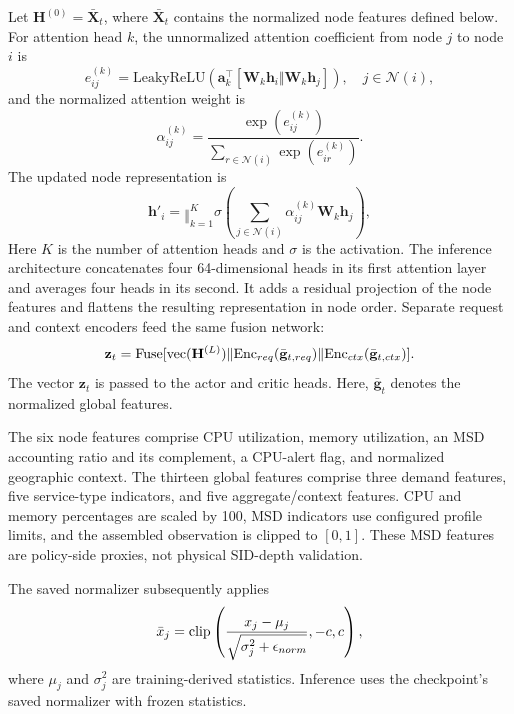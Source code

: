 \documentclass[final,5p]{elsarticle}
\newcommand{\rev}[1]{\textcolor{revisiongreen}{#1}}
\let\newrev\rev
\begin{document}
Let \rev{\(\mathbf{H}^{(0)}=\bar{\mathbf{X}}_t\), where \(\bar{\mathbf X}_t\) contains the normalized node features defined below.} For attention head \(k\), the unnormalized attention coefficient from node \(j\) to node \(i\) is
\begin{equation}
    e_{ij}^{(k)}
    =
    \mathrm{LeakyReLU}
    \left(
    \mathbf{a}_{k}^{\top}
    [\mathbf{W}_{k}\mathbf{h}_i \Vert \mathbf{W}_{k}\mathbf{h}_j]
    \right),
    \quad j\in\mathcal{N}(i),
\end{equation}
and the normalized attention weight is
\begin{equation}
    \alpha_{ij}^{(k)}
    =
    \frac{\exp(e_{ij}^{(k)})}
    {\sum_{r\in\mathcal{N}(i)}\exp(e_{ir}^{(k)})}.
\end{equation}
The updated node representation is
\begin{equation}
    \mathbf{h}'_i
    =
    \mathop{\Vert}_{k=1}^{K}
    \sigma
    \left(
    \sum_{j\in\mathcal{N}(i)}
    \alpha_{ij}^{(k)}\mathbf{W}_{k}\mathbf{h}_j
    \right),
\end{equation}
\newrev{Here \(K\) is the number of attention heads and \(\sigma\) is the activation. The inference architecture concatenates four 64-dimensional heads in its first attention layer and averages four heads in its second. It adds a residual projection of the node features and flattens the resulting representation in node order. Separate request and context encoders feed the same fusion network:}
\begin{equation}
\newrev{\mathbf{z}_t=\mathrm{Fuse}[\mathrm{vec}(\mathbf{H}^{(L)})\Vert\mathrm{Enc}_{req}(\bar{\mathbf g}_{t,req})\Vert\mathrm{Enc}_{ctx}(\bar{\mathbf g}_{t,ctx})].}
\end{equation}
The vector \(\mathbf{z}_t\) is passed to the actor and critic heads. \rev{Here, \(\bar{\mathbf g}_t\) denotes the normalized global features.}

\rev{The six node features comprise CPU utilization, memory utilization, an MSD accounting ratio and its complement, a CPU-alert flag, and normalized geographic context. The thirteen global features comprise three demand features, five service-type indicators, and five aggregate/context features. CPU and memory percentages are scaled by 100, MSD indicators use configured profile limits, and the assembled observation is clipped to \([0,1]\). These MSD features are policy-side proxies, not physical SID-depth validation.}

\rev{The saved normalizer subsequently applies}
\begin{equation}
\rev{\bar{x}_j=\mathrm{clip}\left(\frac{x_j-\mu_j}{\sqrt{\sigma_j^2+\epsilon_{norm}}},-c,c\right),}
\end{equation}
\rev{where \(\mu_j\) and \(\sigma_j^2\) are training-derived statistics. \rev{Inference uses the checkpoint's saved normalizer with frozen statistics.}}
\end{document}
